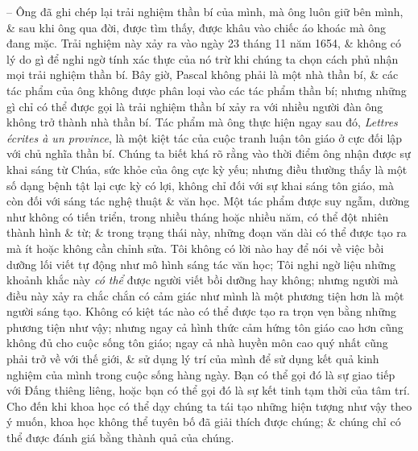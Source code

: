 \documentclass{article}
\begin{document}
\begin{enumerate}
\begin{itemize}
		-- Ông đã ghi chép lại trải nghiệm thần bí của mình, mà ông luôn giữ bên mình, \& sau khi ông qua đời, được tìm thấy, được khâu vào chiếc áo khoác mà ông đang mặc. Trải nghiệm này xảy ra vào ngày 23 tháng 11 năm 1654, \& không có lý do gì để nghi ngờ tính xác thực của nó trừ khi chúng ta chọn cách phủ nhận mọi trải nghiệm thần bí. Bây giờ, {\sc Pascal} không phải là một nhà thần bí, \& các tác phẩm của ông không được phân loại vào các tác phẩm thần bí; nhưng những gì chỉ có thể được gọi là trải nghiệm thần bí xảy ra với nhiều người đàn ông không trở thành nhà thần bí. Tác phẩm mà ông thực hiện ngay sau đó, {\it Lettres \'ecrites \`a un province}, là một kiệt tác của cuộc tranh luận tôn giáo ở cực đối lập với chủ nghĩa thần bí. Chúng ta biết khá rõ rằng vào thời điểm ông nhận được sự khai sáng từ Chúa, sức khỏe của ông cực kỳ yếu; nhưng điều thường thấy là một số dạng bệnh tật lại cực kỳ có lợi, không chỉ đối với sự khai sáng tôn giáo, mà còn đối với sáng tác nghệ thuật \& văn học. Một tác phẩm được suy ngẫm, dường như không có tiến triển, trong nhiều tháng hoặc nhiều năm, có thể đột nhiên thành hình \& từ; \& trong trạng thái này, những đoạn văn dài có thể được tạo ra mà ít hoặc không cần chỉnh sửa. Tôi không có lời nào hay để nói về việc bồi dưỡng lối viết tự động như mô hình sáng tác văn học; Tôi nghi ngờ liệu những khoảnh khắc này {\it có thể} được người viết bồi dưỡng hay không; nhưng người mà điều này xảy ra chắc chắn có cảm giác như mình là một phương tiện hơn là một người sáng tạo. Không có kiệt tác nào có thể được tạo ra trọn vẹn bằng những phương tiện như vậy; nhưng ngay cả hình thức cảm hứng tôn giáo cao hơn cũng không đủ cho cuộc sống tôn giáo; ngay cả nhà huyền môn cao quý nhất cũng phải trở về với thế giới, \& sử dụng lý trí của mình để sử dụng kết quả kinh nghiệm của mình trong cuộc sống hàng ngày. Bạn có thể gọi đó là sự giao tiếp với Đấng thiêng liêng, hoặc bạn có thể gọi đó là sự kết tinh tạm thời của tâm trí. Cho đến khi khoa học có thể dạy chúng ta tái tạo những hiện tượng như vậy theo ý muốn, khoa học không thể tuyên bố đã giải thích được chúng; \& chúng chỉ có thể được đánh giá bằng thành quả của chúng.
		

\end{itemize}
\end{enumerate}
\end{document}
